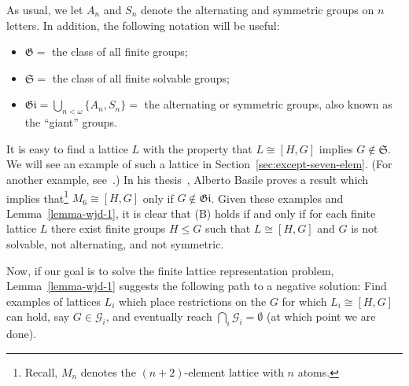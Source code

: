 \documentclass[cm,dissertation,actual,final]{uhthesis}
\theoremstyle{plain}
\theoremstyle{definition}
\theoremstyle{remark}
\numberwithin{theorem}{section}
\numberwithin{claim}{chapter}
\numberwithin{equation}{section}
\numberwithin{conjecture}{chapter}
\newcommand{\<}{\ensuremath{\langle}}
\renewcommand{\>}{\ensuremath{\rangle}}
\renewcommand{\leq}{\ensuremath{\leqslant}}
\newcommand{\0}{\ensuremath{\mathbf{0}}}
\newcommand{\1}{\ensuremath{\mathbf{1}}}
\newcommand{\2}{\ensuremath{\mathbf{2}}}
\newcommand{\3}{\ensuremath{\mathbf{3}}}
\newcommand{\4}{\ensuremath{\mathbf{4}}}
\newcommand{\5}{\ensuremath{\mathbf{5}}}
\newcommand{\sG}{\ensuremath{\mathscr{G}}}
\newcommand{\G}{\ensuremath{\mathfrak{G}}}
\newcommand{\giant}{\ensuremath{\mathfrak{Gi}}}
\newcommand{\solvable}{\ensuremath{\mathfrak{S}}}
\begin{document}
As usual, we let $A_n$ and $S_n$ denote the alternating and symmetric groups on
$n$ letters.  In addition, the following notation will be useful:
\begin{itemize}
\item $\G = $ the class of all finite groups;
\item $\solvable = $ the class of all finite solvable groups;
\item $\giant = \bigcup\limits_{n<\omega} \{A_n, S_n\} = $ the alternating or symmetric groups, 
also known as the ``giant'' groups.
\end{itemize}

It is easy to find a lattice $L$ with the property that
$L \cong [H, G]$ implies $G\notin \solvable$.
We will see an example of such a lattice in
Section~\ref{sec:except-seven-elem}.  (For another example, see~\cite{Palfy:1995}.)
%
In his thesis~\cite{Basile:2001}, Alberto Basile proves a result 
which implies that\footnote{Recall, $M_n$ denotes the $(n+2)$-element lattice with $n$ atoms.}%
$M_6 \cong [H, G]$ only if 
$G\notin \giant$. 
Given these examples and Lemma~\ref{lemma-wjd-1}, it is clear that
(B) holds if and only if for each finite lattice $L$ there 
exist finite groups $H \leq G$ such that $L\cong [H,G]$ and $G$ 
is not solvable, not alternating, and not symmetric.

Now, if our goal is to solve the finite lattice
representation problem, Lemma~\ref{lemma-wjd-1} suggests the following path to a
negative solution:
Find examples of lattices $L_i$ which place restrictions on the $G$ for which $L_i
\cong [H,G]$ can hold, say $G\in \sG_i$, and eventually reach $\bigcap_i
\sG_i = \emptyset$ (at which point we are done).  
\end{document}

